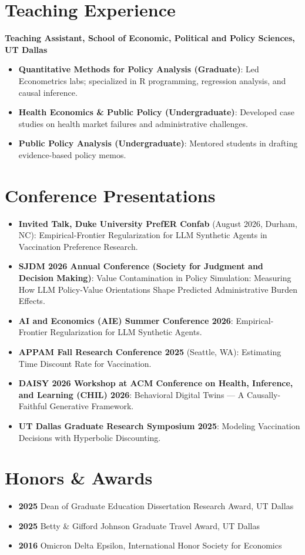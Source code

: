 \documentclass[11pt, letterpaper]{article}
\begin{document}
\section*{Teaching Experience}
\textbf{Teaching Assistant, School of Economic, Political and Policy Sciences, UT Dallas}
\begin{itemize}[noitemsep, topsep=0pt]
    \item \textbf{Quantitative Methods for Policy Analysis (Graduate)}: Led Econometrics labs; specialized in R programming, regression analysis, and causal inference.
    \item \textbf{Health Economics \& Public Policy (Undergraduate)}: Developed case studies on health market failures and administrative challenges.
    \item \textbf{Public Policy Analysis (Undergraduate)}: Mentored students in drafting evidence-based policy memos.
\end{itemize}

\section*{Conference Presentations}
\begin{itemize}[noitemsep, topsep=0pt]
    \item \textbf{Invited Talk, Duke University PrefER Confab} (August 2026, Durham, NC): Empirical-Frontier Regularization for LLM Synthetic Agents in Vaccination Preference Research.
    \item \textbf{SJDM 2026 Annual Conference (Society for Judgment and Decision Making)}: Value Contamination in Policy Simulation: Measuring How LLM Policy-Value Orientations Shape Predicted Administrative Burden Effects.
    \item \textbf{AI and Economics (AIE) Summer Conference 2026}: Empirical-Frontier Regularization for LLM Synthetic Agents.
    \item \textbf{APPAM Fall Research Conference 2025} (Seattle, WA): Estimating Time Discount Rate for Vaccination.
    \item \textbf{DAISY 2026 Workshop at ACM Conference on Health, Inference, and Learning (CHIL) 2026}: Behavioral Digital Twins --- A Causally-Faithful Generative Framework.
    \item \textbf{UT Dallas Graduate Research Symposium 2025}: Modeling Vaccination Decisions with Hyperbolic Discounting.
\end{itemize}

\section*{Honors \& Awards}
\begin{itemize}[noitemsep, topsep=0pt]
    \item \textbf{2025} Dean of Graduate Education Dissertation Research Award, UT Dallas
    \item \textbf{2025} Betty \& Gifford Johnson Graduate Travel Award, UT Dallas
    \item \textbf{2016} Omicron Delta Epsilon, International Honor Society for Economics
\end{itemize}
\end{document}
